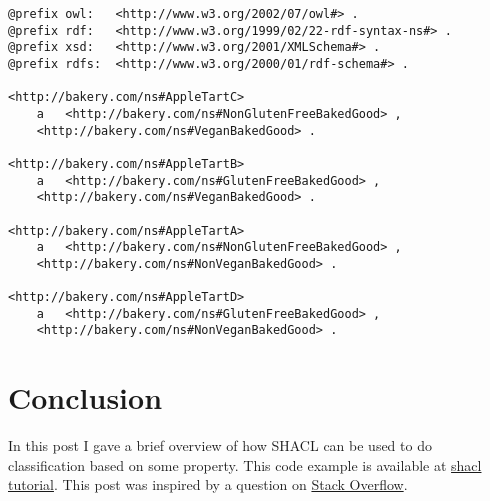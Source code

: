\documentclass{amsart}
\begin{document}
  \begin{small}
  \begin{Verbatim} 
@prefix owl:   <http://www.w3.org/2002/07/owl#> .
@prefix rdf:   <http://www.w3.org/1999/02/22-rdf-syntax-ns#> .
@prefix xsd:   <http://www.w3.org/2001/XMLSchema#> .
@prefix rdfs:  <http://www.w3.org/2000/01/rdf-schema#> .

<http://bakery.com/ns#AppleTartC>
    a	<http://bakery.com/ns#NonGlutenFreeBakedGood> , 
	<http://bakery.com/ns#VeganBakedGood> .

<http://bakery.com/ns#AppleTartB>
    a   <http://bakery.com/ns#GlutenFreeBakedGood> , 
	<http://bakery.com/ns#VeganBakedGood> .

<http://bakery.com/ns#AppleTartA>
    a   <http://bakery.com/ns#NonGlutenFreeBakedGood> , 
	<http://bakery.com/ns#NonVeganBakedGood> .

<http://bakery.com/ns#AppleTartD>
    a   <http://bakery.com/ns#GlutenFreeBakedGood> , 
	<http://bakery.com/ns#NonVeganBakedGood> .
  \end{Verbatim}
  \end{small}

  \section{Conclusion}
  In this post I gave a brief overview of how SHACL can be used to do classification based on some property. This code example is available at 
  \href{https://github.com/henrietteharmse/henrietteharmse/tree/master/blog/tutorial/jena/source/shacl}{shacl tutorial}. This post was inspired by a question on \href{https://stackoverflow.com/questions/49253553/owl-rdf-ttl-make-an-instance-member-of-class-based-on-property}{Stack Overflow}.
  
  
  
  
  
  
  
 
\end{document}
